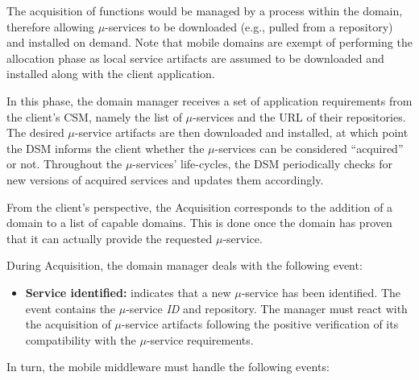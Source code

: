 The acquisition of functions would be managed by a process within the domain, therefore allowing $\mu$-services to be downloaded (e.g., pulled from a repository) and installed on demand. Note that mobile domains are exempt of performing the allocation phase as local service artifacts are assumed to be downloaded and installed along with the client application.


In this phase, the domain manager receives a set of application requirements from the client's CSM, namely the list of $\mu$-services and the URL of their repositories. The desired $\mu$-service artifacts are then downloaded and installed, at which point the DSM informs the client whether the $\mu$-services can be considered ``acquired'' or not. 
Throughout the $\mu$-services' life-cycles, the DSM periodically checks for new versions of acquired services and updates them accordingly. 

From the client's perspective, the Acquisition corresponds to the addition of a domain to a list of capable domains. This is done once the domain has proven that it can actually provide the requested $\mu$-service. 

During Acquisition, the domain manager deals with the following event:

\begin{itemize}
	
	\item \textbf{Service identified:} indicates that a new $\mu$-service has been identified. The event contains the $\mu$-service \textit{ID} and repository. The manager must react with the acquisition of $\mu$-service artifacts following the positive verification of its compatibility with the $\mu$-service requirements.
	
	
\end{itemize}

In turn, the mobile middleware must handle the following events:

